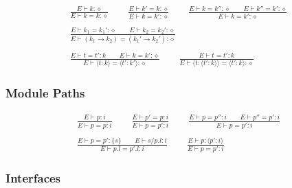 \documentclass[twoside]{article}
\begin{document}
\begin{displaymath}
\begin{array}{c}
\displaystyle
\frac{
E \vdash k : \diamond
}{
E \vdash k = k : \diamond
}
\qquad
\frac{
E \vdash k' = k : \diamond
}{
E \vdash k = k' : \diamond
}
\qquad
\frac{
E \vdash k = k'' : \diamond
\qquad
E \vdash k'' = k' : \diamond
}{
E \vdash k = k' : \diamond
}
\\\\\displaystyle
\frac{
E \vdash k_1 = k_1' : \diamond
\qquad
E \vdash k_2 = k_2' : \diamond
}{
E \vdash (k_1\to k_2) = (k_1'\to k_2') : \diamond
}
\\\\\displaystyle
\frac{
E \vdash t = t' : k
\qquad
E \vdash k = k' : \diamond
}{
E \vdash \langle t:k\rangle = \langle t':k'\rangle : \diamond
}
\qquad
\frac{
E \vdash t = t' : k
}{
E \vdash \langle t:\langle t':k\rangle\rangle = \langle t':k\rangle : \diamond
}
\end{array}
\end{displaymath}


\subsubsection*{Module Paths \hfill
{}
}

\begin{displaymath}
\begin{array}{c}
\displaystyle
\frac{
E \vdash p : i
}{
E \vdash p = p : i
}
\qquad
\frac{
E \vdash p' = p : i
}{
E \vdash p = p' : i
}
\qquad
\frac{
E \vdash p = p'' : i
\qquad
E \vdash p'' = p' : i
}{
E \vdash p = p' : i
}
\\\\\displaystyle
\frac{
E \vdash p = p' : \{s\}
\qquad
E \vdash s/p.l : i
}{
E \vdash p.l = p'.l : i
}
\qquad
\frac{
E \vdash p : \langle p':i\rangle
}{
E \vdash p = p' : i
}
\end{array}
\end{displaymath}



\subsubsection*{Interfaces \hfill
{}
}
\end{document}
